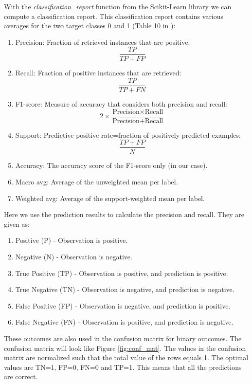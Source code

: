 \documentclass[12pt,a4paper,english]{article}
\begin{document}
With the \textit{classification\_report} function from the Scikit-Learn library we can compute a classification report. This classification report contains various averages for the two target classes 0 and 1 (Table 10 in \citet{pulsar_art}):
\begin{enumerate}
	\item Precision: Fraction of retrieved instances that are positive: \[\frac{TP}{TP+FP}\]
	\item Recall: Fraction of positive instances that are retrieved:
	\[\frac{TP}{TP+FN}\]
	\item F1-score: Measure of accuracy that considers both precision and recall:
	\[2\times\frac{\text{Precision}\times\text{Recall}}{\text{Precision}+\text{Recall}}\]
	\item Support: Predictive positive rate=fraction of positively predicted examples:
	\[\frac{TP+FP}{N}\]
	\item Accuracy: The accuracy score of the F1-score only (in our case).
	\item Macro avg: Average of the unweighted mean per label.
	\item Weighted avg: Average of the support-weighted mean per label.
\end{enumerate}
Here we use the prediction results to calculate the precision and recall. They are given as:
\begin{enumerate}
\label{enu:outcomes}
	\item[] Positive (P) - Observation is positive.
	\item[] Negative (N) - Observation is negative.
	\item[] True Positive (TP) - Observation is positive, and prediction is positive.
	\item[] True Negative (TN) - Observation is negative, and prediction is negative.
	\item[] False Positive (FP) - Observation is negative, and prediction is positive.
	\item[] False Negative (FN) - Observation is positive, and prediction is negative.
\end{enumerate}

These outcomes are also used in the confusion matrix for binary outcomes. The confusion matrix will look like Figure \ref{fig:conf_mat}. The values in the confusion matrix are normalized such that the total value of the rows equals 1. The optimal values are TN=1, FP=0, FN=0 and TP=1. This means that all the predictions are correct.
\end{document}
